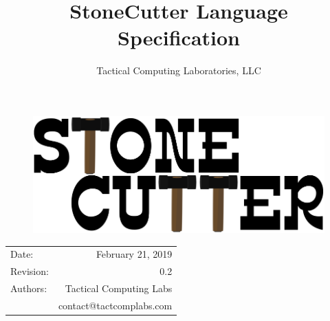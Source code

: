 \documentclass{article}
\title{StoneCutter Language\\Specification} %
\author{Tactical Computing Laboratories, LLC} %
\date{} %
\begin{document}
\begin{figure}
\begin{center}
\includegraphics[width=5in]{figures/stonecutter.png} %
\end{center}
\end{figure}

\maketitle %
\thispagestyle{fancy} %

\begin{center}
\begin{tabular}{l r}
Date: & February 21, 2019 \\ %
Revision: & 0.2 \\         %
Authors: & Tactical Computing Labs\\ %
& contact@tactcomplabs.com\\
\end{tabular}
\end{center}



\clearpage
\tableofcontents
\clearpage


\clearpage
\listoffigures
\lstlistoflistings
\listoftables
\clearpage
\end{document}
